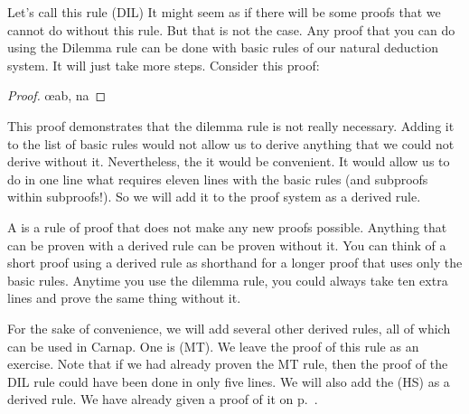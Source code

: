 Let's call this rule  (DIL) It might seem as if there will be some proofs that we cannot do without this rule. But that is not the case. Any proof that you can do using the Dilemma rule can be done with basic rules of our natural deduction system. It will just take more steps. Consider this proof:

\begin{proof}
	 
	 
	\open
		\open
			 
		\close
		\open
		\close
		\oe{ab, na}
	\close
	 
\end{proof}

This proof demonstrates that the dilemma rule is not really necessary. Adding it to the list of basic rules would not allow us to derive anything that we could not derive without it.
Nevertheless, the it would be convenient. It would allow us to do in one line what requires eleven lines with the basic rules (and subproofs within subproofs!). So we will add it to the proof system as a derived rule.

A  is a rule of proof that does not make any new proofs possible. Anything that can be proven with a derived rule can be proven without it. You can think of a short proof using a derived rule as shorthand for a longer proof that uses only the basic rules. Anytime you use the dilemma rule, you could always take ten extra lines and prove the same thing without it.

For the sake of convenience, we will add several other derived rules, all of which can be used in Carnap. One is  (MT).
\noindent We leave the proof of this rule as an exercise. Note that if we had already proven the MT rule, then the proof of the DIL rule could have been done in only five lines.
We will also add the  (HS) as a derived rule. We have already given a proof of it on p.~\pageref{HSproof}.

